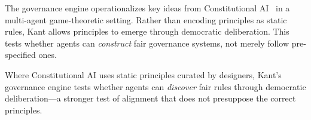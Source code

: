 The governance engine operationalizes key ideas from Constitutional
AI~\citep{bai2022constitutional} in a multi-agent game-theoretic setting.
Rather than encoding principles as static rules, Kant allows principles to
emerge through democratic deliberation. This tests whether agents can
\emph{construct} fair governance systems, not merely follow pre-specified ones.

Where Constitutional AI uses static principles curated by designers,
Kant's governance engine tests whether agents can \emph{discover} fair
rules through democratic deliberation---a stronger test of alignment
that does not presuppose the correct principles.

